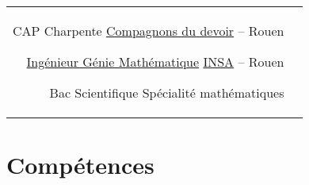 \documentclass[10pt]{article} %
\begin{document}
\begin{paracol}{2}


  \begin{supertabular}{rl} %


    {CAP Charpente} %
    {} %
    {} %
    {\href{https://www.compagnons-du-devoir.com/}{Compagnons du devoir} -- Rouen} %


    {\href{https://www.insa-rouen.fr/formation/specialites-ingenieurses/genie-mathematique}{Ingénieur Génie Mathématique}} %
    {} %
    {} %
    {\href{https://www.insa-rouen.fr/}{INSA} -- Rouen} %


    {Bac Scientifique} %
    {} %
    {} %
    {Spécialité mathématiques} %


  \end{supertabular}


  \section{Compétences}





\end{paracol}
\end{document}
